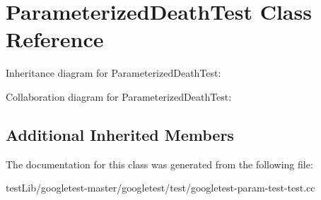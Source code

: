 \hypertarget{classParameterizedDeathTest}{}\section{Parameterized\+Death\+Test Class Reference}
\label{classParameterizedDeathTest}


Inheritance diagram for Parameterized\+Death\+Test\+:


Collaboration diagram for Parameterized\+Death\+Test\+:
\subsection*{Additional Inherited Members}


The documentation for this class was generated from the following file\+:\begin{DoxyCompactItemize}
\item 
test\+Lib/googletest-\/master/googletest/test/googletest-\/param-\/test-\/test.\+cc\end{DoxyCompactItemize}
